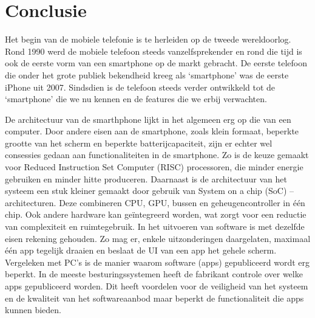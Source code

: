 \chapter{Conclusie}

Het begin van de mobiele telefonie is te herleiden op de tweede wereldoorlog. Rond 1990 werd de mobiele telefoon steeds vanzelfsprekender en rond die tijd is ook de eerste vorm van een smartphone op de markt gebracht. De eerste telefoon die onder het grote publiek bekendheid kreeg als ‘smartphone’ was de eerste iPhone uit 2007. Sindsdien is de telefoon steeds verder ontwikkeld tot de ‘smartphone’ die we nu kennen en de features die we erbij verwachten.

De architectuur van de smarthphone lijkt in het algemeen erg op die van een computer. Door andere eisen aan de smartphone, zoals klein formaat, beperkte grootte van het scherm en beperkte batterijcapaciteit, zijn er echter wel consessies gedaan aan functionaliteiten in de smartphone. Zo is de keuze gemaakt voor Reduced Instruction Set Computer (RISC) processoren, die minder energie gebruiken en minder hitte produceren. Daarnaast is de architectuur van het systeem een stuk kleiner gemaakt door gebruik van System on a chip (SoC) –architecturen. Deze combineren CPU, GPU, bussen en geheugencontroller in één chip. Ook andere hardware kan geïntegreerd worden, wat zorgt voor een reductie van complexiteit en ruimtegebruik. In het uitvoeren van software is met dezelfde eisen rekening gehouden. Zo mag er, enkele uitzonderingen daargelaten, maximaal \'e\'en app tegelijk draaien en beslaat de UI van een app het gehele scherm. Vergeleken met PC's is de manier waarom software (apps) gepubliceerd wordt erg beperkt. In de meeste besturingssystemen heeft de fabrikant controle over welke apps gepubliceerd worden. Dit heeft voordelen voor de veiligheid van het systeem en de kwaliteit van het softwareaanbod maar beperkt de functionaliteit die apps kunnen bieden.


